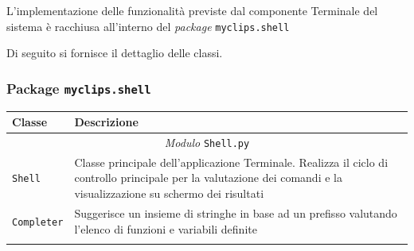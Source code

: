 L'implementazione delle funzionalità previste dal componente Terminale del sistema è racchiusa all'interno del \emph{package} \texttt{myclips.shell}

Di seguito si fornisce il dettaglio delle classi.

\subsubsection{Package \texttt{myclips.shell}}

\begin{longtable}{p{5.5cm}p{6.5cm}}
\hline 
\textbf{Classe} & \textbf{Descrizione} \\ 
\hline\hline 
\endhead

\multicolumn{2}{c}{\emph{Modulo} \texttt{Shell.py}}\\
	\hdashline[5pt/5pt]
		\texttt{Shell} & Classe principale dell'applicazione Terminale. Realizza il ciclo di controllo principale per la valutazione dei comandi e la visualizzazione su schermo dei risultati \\ 
	\hdashline[5pt/5pt]
		\texttt{Completer} & Suggerisce un insieme di stringhe in base ad un prefisso valutando l'elenco di funzioni e variabili definite \\ 
	\hline\\

\end{longtable}

